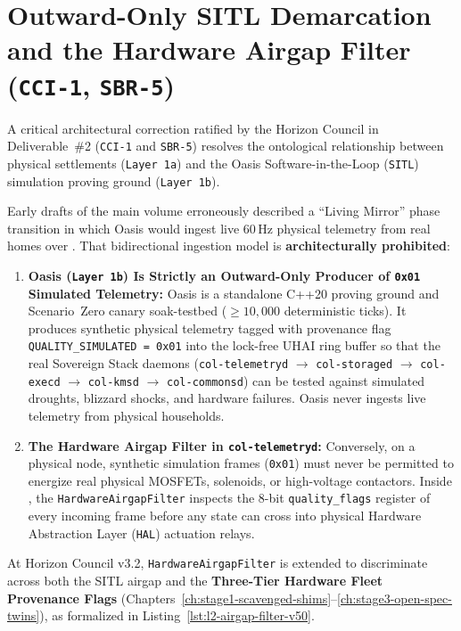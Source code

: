 \section{Outward-Only SITL Demarcation and the Hardware Airgap Filter (\texttt{CCI-1}, \texttt{SBR-5})}
\label{sec:l2-hardware-airgap-filter}

A critical architectural correction ratified by the Horizon Council in Deliverable~\#2 (\texttt{CCI-1} and \texttt{SBR-5}) resolves the ontological relationship between physical settlements (\texttt{Layer 1a}) and the Oasis Software-in-the-Loop (\texttt{SITL}) simulation proving ground (\texttt{Layer 1b}).

Early drafts of the main volume erroneously described a ``Living Mirror'' phase transition in which Oasis would ingest live $60\,\mathrm{Hz}$ physical telemetry from real homes over . That bidirectional ingestion model is \textbf{architecturally prohibited}:
\begin{enumerate}
    \item \textbf{Oasis (\texttt{Layer 1b}) Is Strictly an Outward-Only Producer of \texttt{0x01} Simulated Telemetry:} Oasis is a standalone C++20 proving ground and Scenario~Zero canary soak-testbed ($\ge 10{,}000$ deterministic ticks). It produces synthetic physical telemetry tagged with provenance flag \texttt{QUALITY\_SIMULATED = 0x01} into the lock-free UHAI ring buffer so that the real Sovereign Stack daemons (\texttt{col-telemetryd} $\to$ \texttt{col-storaged} $\to$ \texttt{col-execd} $\to$ \texttt{col-kmsd} $\to$ \texttt{col-commonsd}) can be tested against simulated droughts, blizzard shocks, and hardware failures. Oasis never ingests live telemetry from physical households.
    \item \textbf{The Hardware Airgap Filter in \texttt{col-telemetryd}:} Conversely, on a physical node, synthetic simulation frames (\texttt{0x01}) must never be permitted to energize real physical MOSFETs, solenoids, or high-voltage contactors. Inside , the \texttt{HardwareAirgapFilter} inspects the 8-bit \texttt{quality\_flags} register of every incoming frame before any state can cross into physical Hardware Abstraction Layer (\texttt{HAL}) actuation relays.
\end{enumerate}

At Horizon Council v3.2, \texttt{HardwareAirgapFilter} is extended to discriminate across both the SITL airgap and the \textbf{Three-Tier Hardware Fleet Provenance Flags} (Chapters~\ref{ch:stage1-scavenged-shims}--\ref{ch:stage3-open-spec-twins}), as formalized in Listing~\ref{lst:l2-airgap-filter-v50}.

